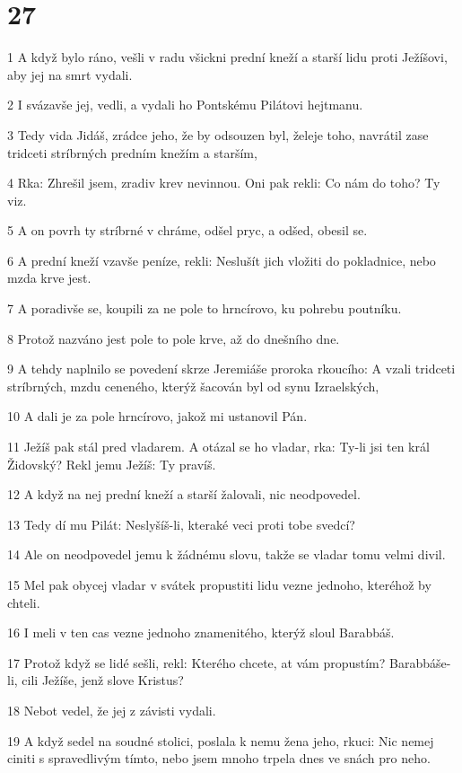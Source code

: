 \chapter{27}

\par 1 A když bylo ráno, vešli v radu všickni prední kneží a starší lidu proti Ježíšovi, aby jej na smrt vydali.
\par 2 I svázavše jej, vedli, a vydali ho Pontskému Pilátovi hejtmanu.
\par 3 Tedy vida Jidáš, zrádce jeho, že by odsouzen byl, želeje toho, navrátil zase tridceti stríbrných predním knežím a starším,
\par 4 Rka: Zhrešil jsem, zradiv krev nevinnou. Oni pak rekli: Co nám do toho? Ty viz.
\par 5 A on povrh ty stríbrné v chráme, odšel pryc, a odšed, obesil se.
\par 6 A prední kneží vzavše peníze, rekli: Neslušít jich vložiti do pokladnice, nebo mzda krve jest.
\par 7 A poradivše se, koupili za ne pole to hrncírovo, ku pohrebu poutníku.
\par 8 Protož nazváno jest pole to pole krve, až do dnešního dne.
\par 9 A tehdy naplnilo se povedení skrze Jeremiáše proroka rkoucího: A vzali tridceti stríbrných, mzdu ceneného, kterýž šacován byl od synu Izraelských,
\par 10 A dali je za pole hrncírovo, jakož mi ustanovil Pán.
\par 11 Ježíš pak stál pred vladarem. A otázal se ho vladar, rka: Ty-li jsi ten král Židovský? Rekl jemu Ježíš: Ty pravíš.
\par 12 A když na nej prední kneží a starší žalovali, nic neodpovedel.
\par 13 Tedy dí mu Pilát: Neslyšíš-li, kteraké veci proti tobe svedcí?
\par 14 Ale on neodpovedel jemu k žádnému slovu, takže se vladar tomu velmi divil.
\par 15 Mel pak obycej vladar v svátek propustiti lidu vezne jednoho, kteréhož by chteli.
\par 16 I meli v ten cas vezne jednoho znamenitého, kterýž sloul Barabbáš.
\par 17 Protož když se lidé sešli, rekl: Kterého chcete, at vám propustím? Barabbáše-li, cili Ježíše, jenž slove Kristus?
\par 18 Nebot vedel, že jej z závisti vydali.
\par 19 A když sedel na soudné stolici, poslala k nemu žena jeho, rkuci: Nic nemej ciniti s spravedlivým tímto, nebo jsem mnoho trpela dnes ve snách pro neho.
